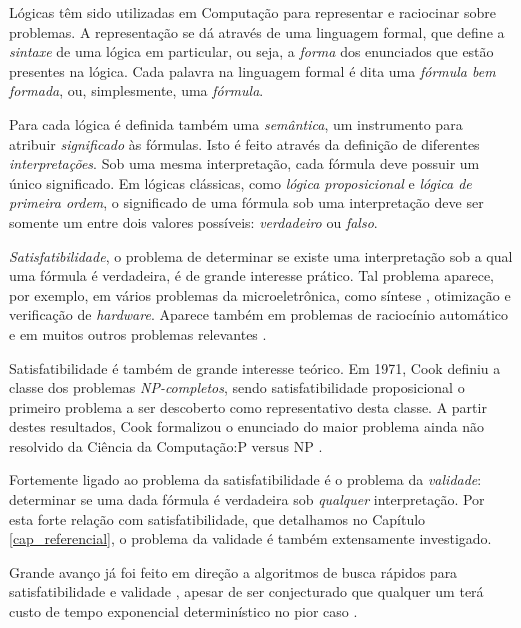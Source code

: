 \indent

Lógicas têm sido utilizadas em Computação para representar e raciocinar sobre problemas. A representação se dá através de uma linguagem formal, que define a \emph{sintaxe} de uma lógica em particular, ou seja, a \emph{forma} dos enunciados que estão presentes na lógica. Cada palavra na linguagem formal é dita uma \emph{fórmula bem formada}, ou, simplesmente, uma \emph{fórmula}.

Para cada lógica é definida também uma \emph{semântica}, um instrumento para atribuir \emph{significado} às fórmulas. Isto é feito através da definição de diferentes \emph{interpretações}. Sob uma mesma interpretação, cada fórmula deve possuir um único significado. Em lógicas clássicas, como \emph{lógica proposicional} e \emph{lógica de primeira ordem}, o significado de uma fórmula sob uma interpretação deve ser somente um entre dois valores possíveis: \emph{verdadeiro} ou \emph{falso}.

\emph{Satisfatibilidade}, o problema de determinar se existe uma interpretação sob a qual uma fórmula é verdadeira, é de grande interesse prático. Tal problema aparece, por exemplo, em vários problemas da microeletrônica, como síntese \cite{bloem2014sat}, otimização \cite{gupta2006sat} e verificação \cite{nieuwenhuis2006sat} de \textit{hardware}. Aparece também em problemas de raciocínio automático \cite{harrison2009handbook} e em muitos outros problemas relevantes \cite{horvitz1992automated}.

Satisfatibilidade é também de grande interesse teórico. Em 1971, Cook definiu a classe dos problemas \emph{NP-completos}, sendo satisfatibilidade proposicional o primeiro problema a ser descoberto como representativo desta classe. A partir destes resultados, Cook formalizou o enunciado do maior problema ainda não resolvido da Ciência da Computação:\break P versus NP \cite{cook1971complexity}.

Fortemente ligado ao problema da satisfatibilidade é o problema da \emph{validade}: determinar se uma dada fórmula é verdadeira sob \emph{qualquer} interpretação. Por esta forte relação com satisfatibilidade, que detalhamos no Capítulo \ref{cap_referencial}, o problema da validade é também extensamente investigado.

Grande avanço já foi feito em direção a algoritmos de busca rápidos para satisfatibilidade e validade \cite{davis1960computing,davis1962machine,biere2009conflict}, apesar de ser conjecturado que qualquer um terá custo de tempo exponencial determinístico no pior caso \cite{cook1971complexity}.

